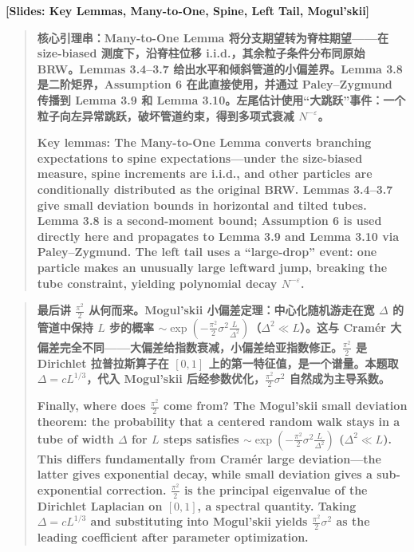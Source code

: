 \documentclass[12pt,a4paper]{article}
\begin{document}
\begin{center}
\color{blue!60!black}\textbf{[Slides: Key Lemmas, Many-to-One, Spine, Left Tail, Mogul'skii]}
\end{center}

\begin{quote}
\textbf{核心引理串：Many-to-One Lemma 将分支期望转为脊柱期望——在 size-biased 测度下，沿脊柱位移 i.i.d.，其余粒子条件分布同原始 BRW。Lemmas 3.4--3.7 给出水平和倾斜管道的小偏差界。Lemma 3.8 是二阶矩界，Assumption 6 在此直接使用，并通过 Paley--Zygmund 传播到 Lemma 3.9 和 Lemma 3.10。左尾估计使用``大跳跃''事件：一个粒子向左异常跳跃，破坏管道约束，得到多项式衰减 $N^{-\varepsilon}$。}

\bigskip

\textbf{Key lemmas: The Many-to-One Lemma converts branching expectations to spine expectations---under the size-biased measure, spine increments are i.i.d., and other particles are conditionally distributed as the original BRW. Lemmas 3.4--3.7 give small deviation bounds in horizontal and tilted tubes. Lemma 3.8 is a second-moment bound; Assumption 6 is used directly here and propagates to Lemma 3.9 and Lemma 3.10 via Paley--Zygmund. The left tail uses a ``large-drop'' event: one particle makes an unusually large leftward jump, breaking the tube constraint, yielding polynomial decay $N^{-\varepsilon}$.}
\end{quote}

\begin{quote}
\textbf{最后讲 $\frac{\pi^2}{2}$ 从何而来。Mogul'skii 小偏差定理：中心化随机游走在宽 $\Delta$ 的管道中保持 $L$ 步的概率 $\sim\exp(-\frac{\pi^2}{2}\sigma^2\frac{L}{\Delta^2})$（$\Delta^2\ll L$）。这与 Cram\'er 大偏差完全不同——大偏差给指数衰减，小偏差给亚指数修正。$\frac{\pi^2}{2}$ 是 Dirichlet 拉普拉斯算子在 $[0,1]$ 上的第一特征值，是一个谱量。本题取 $\Delta=cL^{1/3}$，代入 Mogul'skii 后经参数优化，$\frac{\pi^2}{2}\sigma^2$ 自然成为主导系数。}

\bigskip

\textbf{Finally, where does $\frac{\pi^2}{2}$ come from? The Mogul'skii small deviation theorem: the probability that a centered random walk stays in a tube of width $\Delta$ for $L$ steps satisfies $\sim\exp(-\frac{\pi^2}{2}\sigma^2\frac{L}{\Delta^2})$ ($\Delta^2\ll L$). This differs fundamentally from Cram\'er large deviation---the latter gives exponential decay, while small deviation gives a sub-exponential correction. $\frac{\pi^2}{2}$ is the principal eigenvalue of the Dirichlet Laplacian on $[0,1]$, a spectral quantity. Taking $\Delta=cL^{1/3}$ and substituting into Mogul'skii yields $\frac{\pi^2}{2}\sigma^2$ as the leading coefficient after parameter optimization.}
\end{quote}
\end{document}
